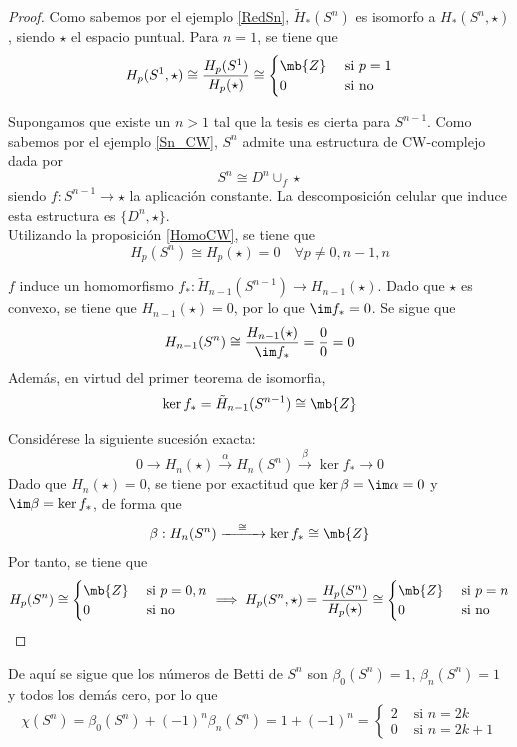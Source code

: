 \begin{proof}
Como sabemos por el ejemplo \ref{RedSn}, $\tilde{H}_*(S^n)$ es isomorfo a $H_*(S^n,\star)$, siendo $\star$ el espacio puntual. Para $n=1$, se tiene que \[H_p(S^1,\star)\cong\frac{H_p(S^1)}{H_p(\star)}\cong \begin{cases}\mb{Z}&\mbox{ si }p=1\\0&\mbox{ si no}\end{cases}\]

Supongamos que existe un $n > 1$ tal que la tesis es cierta para $S^{n-1}$. Como sabemos por el ejemplo \ref{Sn_CW}, $S^n$ admite una estructura de CW-complejo dada por $$S^n\cong D^n\cup_f \star$$ siendo $f: S^{n-1} \longrightarrow \star$ la aplicación constante. La descomposición celular que induce esta estructura es $\{D^n,\star\}$.
\\

Utilizando la proposición \ref{HomoCW}, se tiene que \[H_p(S^n)\cong H_p(\star)=0 \quad \forall p\neq 0, n-1,n\]

$f$ induce un homomorfismo $f_*: \tilde{H}_{n-1}(S^{n-1}) \longrightarrow H_{n-1}(\star)$. Dado que $\star$ es convexo, se tiene que $H_{n-1}(\star)=0$, por lo que $\im f_*=0$. Se sigue que \[H_{n-1}(S^n)\cong \frac{H_{n-1}(\star)}{\im f_*}=\frac{0}{0}=0\] Además, en virtud del primer teorema de isomorfia, \[\ker f_*=\tilde{H}_{n-1}(S^{n-1})\cong \mb{Z}\]

Considérese la siguiente sucesión exacta: \[0 \longrightarrow H_n(\star) \xrightarrow{\alpha} H_n(S^n) \xrightarrow{\beta} \ker f_* \longrightarrow 0\] Dado que $H_n(\star)=0$, se tiene por exactitud que $\ker \beta=\im \alpha=0$ y $\im \beta=\ker f_*$, de forma que \[\beta: H_n(S^n) \xrightarrow{\quad\cong\quad}\ker f_* \cong \mb{Z}\] Por tanto, se tiene que \[H_p(S^n)\cong \begin{cases}\mb{Z}&\mbox{ si }p=0,n\\0&\mbox{ si no}\end{cases} \implies H_p(S^n,\star)=\frac{H_p(S^n)}{H_p(\star)}\cong \begin{cases}\mb{Z}&\mbox{ si }p=n\\0&\mbox{ si no}\end{cases}\]
\end{proof}

De aquí se sigue que los números de Betti de $S^n$ son $\beta_0(S^n)=1$, $\beta_n(S^n)=1$ y todos los demás cero, por lo que \[\chi(S^n)=\beta_0(S^n)+(-1)^n\beta_n(S^n)=1+(-1)^n=\begin{cases}2 &\mbox{ si }n=2k \\ 0 & \mbox{ si } n=2k+1\end{cases}\]

